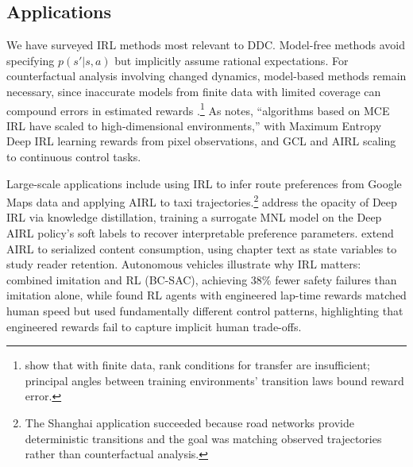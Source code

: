 \subsection{Applications}

We have surveyed IRL methods most relevant to DDC. Model-free methods avoid specifying $p(s'|s,a)$ but implicitly assume rational expectations. For counterfactual analysis involving changed dynamics, model-based methods remain necessary, since inaccurate models from finite data with limited coverage can compound errors in estimated rewards \citep{zeng:2024}.\footnote{\footnotesize \citet{schlaginhaufen:2024} show that with finite data, rank conditions for transfer \citep{rolland:2022} are insufficient; principal angles between training environments' transition laws bound reward error.} As \citet{gleave:2022} notes, ``algorithms based on MCE IRL have scaled to high-dimensional environments,'' with Maximum Entropy Deep IRL \citep{maxentdeepirl:2016} learning rewards from pixel observations, and GCL and AIRL scaling to continuous control tasks.

Large-scale applications include \citet{Barnes:2024} using IRL to infer route preferences from Google Maps data and \citet{zhao:2023} applying AIRL to taxi trajectories.\footnote{\footnotesize The Shanghai application succeeded because road networks provide deterministic transitions and the goal was matching observed trajectories rather than counterfactual analysis.} \citet{liang:2025} address the opacity of Deep IRL via knowledge distillation, training a surrogate MNL model on the Deep AIRL policy's soft labels to recover interpretable preference parameters. \citet{lee:2026} extend AIRL to serialized content consumption, using chapter text as state variables to study reader retention. Autonomous vehicles illustrate why IRL matters: \citet{waymo_bcsac:2023} combined imitation and RL (BC-SAC), achieving 38\% fewer safety failures than imitation alone, while \citet{remonda:2021} found RL agents with engineered lap-time rewards matched human speed but used fundamentally different control patterns, highlighting that engineered rewards fail to capture implicit human trade-offs.


